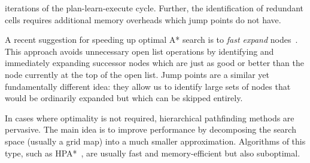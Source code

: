 iterations of the plan-learn-execute cycle. Further, the identification of
redundant cells requires additional memory overheads which jump points do not have. 
\par
A recent suggestion for speeding up optimal A* search is to \emph{fast expand}
nodes~\cite{sun09}.  This approach avoids unnecessary open list operations by
identifying and immediately expanding successor nodes which are just as good or
better than the node currently at the top of the open list.  Jump points are a
similar yet fundamentally different idea: they allow us to identify large sets
of nodes that would be ordinarily expanded but which can be skipped entirely.
\par
In cases where optimality is not required, hierarchical pathfinding methods are pervasive.
The main idea is to improve performance by decomposing the 
search space (usually a grid map) into a much smaller approximation.  Algorithms
of this type, such as HPA*~\cite{botea04}, are  usually fast and memory-efficient 
but also suboptimal.  
